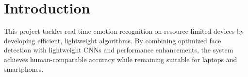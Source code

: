 \section{Introduction}
This project tackles real-time emotion recognition on resource-limited devices by developing efficient, lightweight algorithms. By combining optimized face detection with lightweight CNNs and performance enhancements, the system achieves human-comparable accuracy while remaining suitable for laptops and smartphones.
